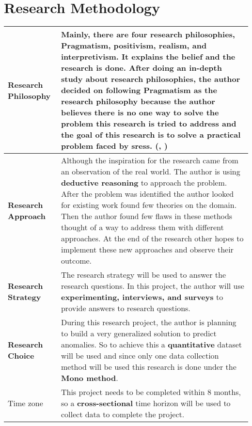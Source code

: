 \newpage
{\let\clearpage\relax \chapter{Research Methodology}}

\begin{longtable}{|p{35mm}|p{125mm}|}
\hline
  \textbf{Research Philosophy} & 
  Mainly, there are four research philosophies, Pragmatism, positivism, realism, and interpretivism. It explains the belief and the research is done. After doing an in-depth study about research philosophies, the author decided on following \textbf{Pragmatism} as the research philosophy because the author believes there is no one way to solve the problem this research is tried to address and the goal of this research is to solve a practical problem faced by \acp{sres}. (\cite{1Philoso75:online}, \cite{Pragmati87:online})
  \\ \hline
  
  \textbf{Research Approach} & 
  Although the inspiration for the research came from an observation of the real world. The author is using \textbf{deductive reasoning} to approach the problem. After the problem was identified the author looked for existing work found few theories on the domain. Then the author found few flaws in these methods thought of a way to address them with different approaches. At the end of the research other hopes to implement these new approaches and observe their outcome.
  \\ \hline
  
  \textbf{Research Strategy} & 
  The research strategy will be used to answer the research questions. In this project, the author will use \textbf{experimenting, interviews, and surveys} to provide answers to research questions.
  \\ \hline
  
  \textbf{Research Choice} & 
  During this research project, the author is planning to build a very generalized solution to predict anomalies.  So to achieve this a \textbf{quantitative} dataset will be used and since only one data collection method will be used this research is done under the\textbf{ Mono method}.
  \\ \hline
  
  Time zone & 
  This project needs to be completed within 8 months, so a \textbf{cross-sectional} time horizon will be used to collect data to complete the project.
  \\ \hline
\end{longtable}
